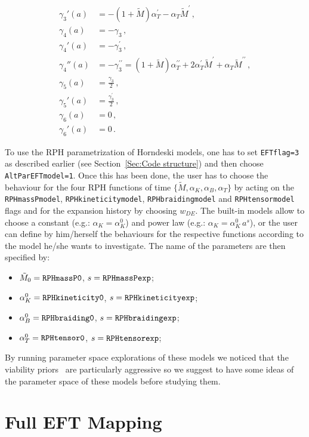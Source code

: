 \documentclass[prd,nofootinbib,showpacs]{revtex4}
\def\f{\frac}
\begin{document}
{\begin{align}
\gamma_3'(a) &= -(1+ \tilde{M})\alpha_T^\prime- \alpha_T \tilde{M}^\prime\,,  \nonumber \\
\gamma_4(a) &= -\gamma_3\,,  \nonumber \\
\gamma_4'(a) &= -\gamma_3^\prime\,,  \nonumber \\
\gamma_4''(a) &= -\gamma_3^{\prime\prime}= (1+ \tilde{M})\alpha_T^{\prime\prime}+2\alpha_T^\prime \tilde{M}^\prime + \alpha_T \tilde{M}^{\prime\prime} \,,  \nonumber \\
\gamma_5(a) &= \f{\gamma_3}{2} \,,  \nonumber \\
\gamma_5'(a) &=  \f{\gamma_3^\prime}{2}\,, \nonumber \\
\gamma_6(a) &= 0\,,  \nonumber \\
\gamma_6'(a) &=0 \,.
\end{align}

To use the  RPH  parametrization of Horndeski models, one has to set \verb|EFTflag=3| as described earlier (see Section~\ref{Sec:Code structure}) and then choose \verb|AltParEFTmodel=1|. Once this has been done, the user has to choose the behaviour for the four RPH functions of time $\{\tilde{M},\alpha_K,\alpha_B,\alpha_T\}$  by acting on the \verb|RPHmassPmodel|, \verb|RPHkineticitymodel|, \verb|RPHbraidingmodel| and \verb|RPHtensormodel| flags and for the expansion history by choosing $w_{DE}$. The built-in models allow to choose a constant (e.g.: $\alpha_K=\alpha_K^0$) and power law (e.g.: $\alpha_K = \alpha_K^0\, a^s$), or the  user can define by him/herself the behaviours for the respective functions according to the model he/she wants to investigate. The name of the parameters are then specified by:
%
\begin{itemize}
\item $\tilde{M}_0 = \verb|RPHmassP0|$, $s = \verb|RPHmassPexp|$;
\item $\alpha_{K}^0 = \verb|RPHkineticity0|$, $s = \verb|RPHkineticityexp|$;
\item $\alpha_{B}^0 = \verb|RPHbraiding0|$, $s = \verb|RPHbraidingexp|$;
\item $\alpha_{T}^0 = \verb|RPHtensor0|$, $s = \verb|RPHtensorexp|$;
\end{itemize}
%
By running parameter space explorations of these models we noticed that the viability priors~\cite{Bellini:2014fua} are particularly aggressive so we suggest to have some ideas of the parameter space of these models before studying them.

\section{Full EFT Mapping}\label{Fullmapping}

}
\end{document}

